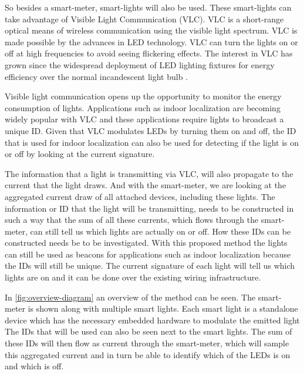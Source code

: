 	So besides a smart-meter, smart-lights will also be used.
	These smart-lights can take advantage of Visible Light Communication (VLC).
	VLC is a short-range optical means of wireless communication using the visible light spectrum.
	VLC is made possible by the advances in LED technology.
	VLC can turn the lights on or off at high frequencies to avoid seeing flickering effects.
	The interest in VLC has grown since the widespread deployment of LED lighting fixtures for energy efficiency over the normal incandescent light bulb \cite{rajagopal2012ieee}.


	Visible light communication opens up the opportunity to monitor the energy consumption of lights. Applications such as indoor localization are becoming widely popular with VLC and these applications require lights to broadcast a unique ID. 
	Given that VLC modulates LEDs by turning them on and off, the ID that is used for indoor localization can also be used for detecting if the light is on or off by looking at the current signature.


	The information that a light is transmitting via VLC, will also propagate to the current that the light draws.
	And with the smart-meter, we are looking at the aggregated current draw of all attached devices, including these lights.
	The information or ID that the light will be transmitting, needs to be constructed in such a way that the sum of all these currents, which flows through the smart-meter, can still tell us which lights are actually on or off.
	How these IDs can be constructed needs be to be investigated.
	With this proposed method the lights can still be used as beacons for applications such as indoor localization because the IDs will still be unique.
	The current signature of each light will tell us which lights are on and it can be done over the existing wiring infrastructure.

	In \autoref{fig:overview-diagram} an overview of the method can be seen.
	The smart-meter is shown along with multiple smart lights. 
	Each smart light is a standalone device which has the necessary embedded hardware to modulate the emitted light
	The IDs that will be used can also be seen next to the smart lights.
	The sum of these IDs will then flow as current through the smart-meter, which will sample this aggregated current and in turn be able to identify which of the LEDs is on and which is off.


